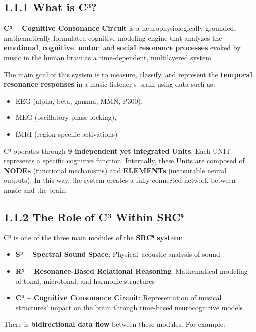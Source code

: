 \subsection*{1.1.1 What is C³?}

\textbf{C³ – Cognitive Consonance Circuit} is a neurophysiologically grounded, mathematically formulated cognitive modeling engine that analyzes the \textbf{emotional}, \textbf{cognitive}, \textbf{motor}, and \textbf{social resonance processes} evoked by music in the human brain as a time-dependent, multilayered system.

The main goal of this system is to measure, classify, and represent the \textbf{temporal resonance responses} in a music listener's brain using data such as:

\begin{itemize}
    \item EEG (alpha, beta, gamma, MMN, P300),
    \item MEG (oscillatory phase-locking),
    \item fMRI (region-specific activations)
\end{itemize}

C³ operates through \textbf{9 independent yet integrated Units}. Each UNIT represents a specific cognitive function. Internally, these Units are composed of \textbf{NODEs} (functional mechanisms) and \textbf{ELEMENTs} (measurable neural outputs). In this way, the system creates a fully connected network between music and the brain.

\subsection*{1.1.2 The Role of C³ Within SRC⁹}

C³ is one of the three main modules of the \textbf{SRC⁹ system}:

\begin{itemize}
    \item \textbf{S³ – Spectral Sound Space}: Physical–acoustic analysis of sound
    \item \textbf{R³ – Resonance-Based Relational Reasoning}: Mathematical modeling of tonal, microtonal, and harmonic structures
    \item \textbf{C³ – Cognitive Consonance Circuit}: Representation of musical structures' impact on the brain through time-based neurocognitive models
\end{itemize}

There is \textbf{bidirectional data flow} between these modules. For example:

